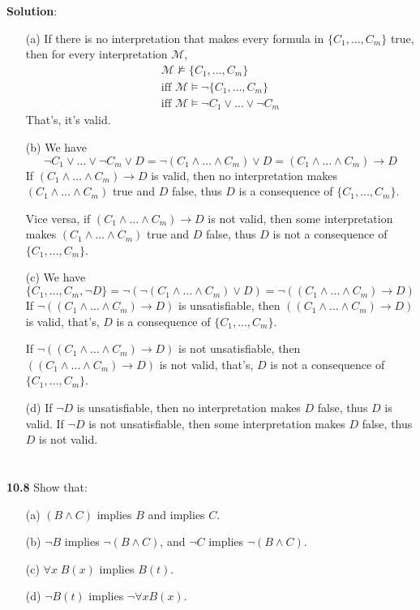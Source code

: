 \documentclass{ctexart}
\begin{document}
\textbf{Solution}:

\begin{itemize}

\item[(a)] If there is no interpretation that makes every formula in $\{C_1 , \dots , C_m \}$ true, then
for every interpretation $\mathcal M$,
\begin{equation*}
\begin{array}{l}
\mathcal M \not\vDash \{C_1 , \dots , C_m \} \\
\mbox{iff } \mathcal M \vDash \lnot \{ C_1, \dots, C_m \} \\
\mbox{iff } \mathcal M \vDash \lnot C_1 \lor \dots \lor \lnot C_m
\end{array}
\end{equation*}
That's, it's valid.

\item[(b)]
We have
$$\lnot C_1 \lor \dots \lor \lnot C_m \lor D = \lnot (C_1 \land \dots \land C_m) \lor D
= (C_1 \land \dots \land C_m) \to D$$
If $(C_1 \land \dots \land C_m) \to D$ is valid, then no interpretation makes $(C_1 \land \dots \land C_m)$ true
and $D$ false, thus $D$ is a consequence of $\{C_1 , \dots , C_m \}$.

Vice versa, if
$(C_1 \land \dots \land C_m) \to D$ is not valid, then some interpretation makes $(C_1 \land \dots \land C_m)$ true
and $D$ false, thus $D$ is not a consequence of $\{C_1 , \dots , C_m \}$.

\item[(c)] We have
$$\{C_1 , \dots , C_m, \lnot D\}
= \lnot (\lnot (C_1 \land \dots \land C_m) \lor D)
= \lnot ((C_1 \land \dots \land C_m) \to D)
$$
If $\lnot ((C_1 \land \dots \land C_m) \to D)$ is unsatisfiable, then $((C_1 \land \dots \land C_m) \to D)$
is valid, that's, $D$ is a consequence of $\{C_1 , \dots , C_m \}$.

If $\lnot ((C_1 \land \dots \land C_m) \to D)$ is not unsatisfiable, then $((C_1 \land \dots \land C_m) \to D)$
is not valid, that's, $D$ is not a consequence of $\{C_1 , \dots , C_m \}$.

\item[(d)] If $\lnot D$ is unsatisfiable, then no interpretation makes $D$ false, thus $D$ is valid.
If $\lnot D$ is not unsatisfiable, then some interpretation makes $D$ false, thus $D$ is not valid.

\end{itemize}

\section*{}
\textbf{10.8}
Show that:
\begin{itemize}
\item[(a)] $(B \land C)$ implies $B$ and implies $C$.
\item[ (b)] $\lnot B$ implies $\lnot(B \land C)$, and $\lnot C$ implies $\lnot (B \land C)$.
\item [(c)] $\forall x\; B(x)$ implies $B(t)$.
\item [(d)] $\lnot B(t)$ implies $\lnot \forall x B(x)$.
\end{itemize}
\end{document}
